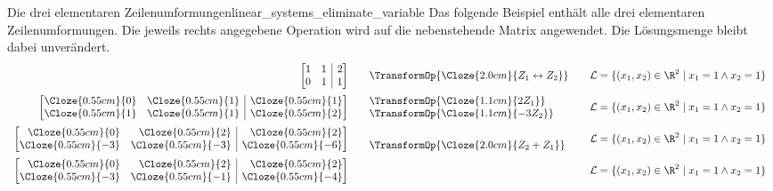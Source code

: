 \begin{ExampleBox}{Die drei elementaren Zeilenumformungen}{linear_systems_eliminate_variable}
  Das folgende Beispiel enthält alle drei elementaren Zeilenumformungen. Die
  jeweils rechts angegebene Operation wird auf die nebenstehende Matrix
  angewendet. Die Lösungsmenge bleibt dabei unverändert.
  \[
    \begin{array}{r@{\qquad}l@{\qquad}l}
      \left[\begin{array}{@{}rr|r@{}}
        1&1&2\\
        0&1&1
      \end{array}\right]
      &\TransformOp{\Cloze{2.0cm}{Z_1\leftrightarrow Z_2}}
      &\mathcal L=\{(x_1,x_2)\in\R^2\mid x_1=1\land x_2=1\}\\[1.2em]
      \left[\begin{array}{@{}rr|r@{}}
        \Cloze{0.55cm}{0}&\Cloze{0.55cm}{1}&\Cloze{0.55cm}{1}\\
        \Cloze{0.55cm}{1}&\Cloze{0.55cm}{1}&\Cloze{0.55cm}{2}
      \end{array}\right]
      &\begin{array}{@{}l@{}}
        \smash{\TransformOp{\Cloze{1.1cm}{2Z_1}}}\\
        \smash{\TransformOp{\Cloze{1.1cm}{-3Z_2}}}
      \end{array}
      &\mathcal L=\{(x_1,x_2)\in\R^2\mid x_1=1\land x_2=1\}\\[1.2em]
      \left[\begin{array}{@{}rr|r@{}}
        \Cloze{0.55cm}{0}&\Cloze{0.55cm}{2}&\Cloze{0.55cm}{2}\\
        \Cloze{0.55cm}{-3}&\Cloze{0.55cm}{-3}&\Cloze{0.55cm}{-6}
      \end{array}\right]
      &\begin{array}{@{}l@{}}
        {}\\
        \smash{\TransformOp{\Cloze{2.0cm}{Z_2+Z_1}}}
      \end{array}
      &\mathcal L=\{(x_1,x_2)\in\R^2\mid x_1=1\land x_2=1\}\\[1.2em]
      \left[\begin{array}{@{}rr|r@{}}
        \Cloze{0.55cm}{0}&\Cloze{0.55cm}{2}&\Cloze{0.55cm}{2}\\
        \Cloze{0.55cm}{-3}&\Cloze{0.55cm}{-1}&\Cloze{0.55cm}{-4}
      \end{array}\right]
      &
      &\mathcal L=\{(x_1,x_2)\in\R^2\mid x_1=1\land x_2=1\}
    \end{array}
  \]
\end{ExampleBox}
